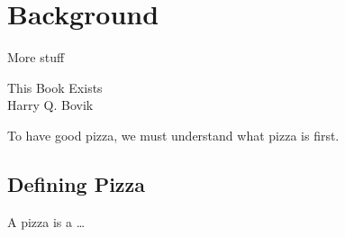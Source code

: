 
\chapter{Background}\label{ch:background}

\epigraph{
  More stuff
}{
  This Book Exists
  \\
  Harry Q. Bovik
}

To have good pizza, we must understand what pizza is first.

\section{Defining Pizza}\label{sec:background:defining-pizza}

A pizza is a \ldots
